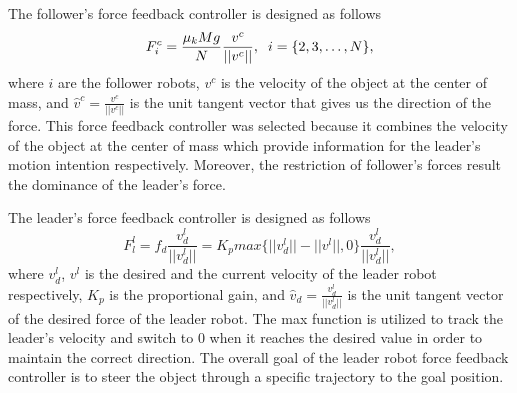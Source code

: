 \documentclass[letterpaper, 10 pt, conference]{ieeeconf}
\begin{document}
The follower's force feedback controller is designed as follows
\begin{equation}\label{cbfc}
F_i^c=\frac{\mu_k Mg}{N}\frac{v^c}{||v^c||}, \hspace{.2cm} i=\{ 2,3,\hdots , N\},
\end{equation}
where $i$ are the follower robots, $v^c$ is the velocity of the object at the center of mass, and $\hat{v}^c=\frac{v^c}{||v^c||}$ is the unit tangent vector that gives us the direction of the force. This force feedback controller was selected because it combines the velocity of the object at the center of mass which provide information for the leader's motion intention respectively. Moreover, the restriction of follower's forces result the dominance  of the leader's force.

The leader's force feedback controller is designed as follows
\begin{equation}\label{cblc}
F_l^l= f_d \frac{v_d^l}{||v_d^l||}= K_pmax\{ ||v_d^l||-||v^l||,0 \}\frac{v_d^l}{||v_d^l||},
\end{equation}
where $v_d^l$, $v^l$ is the desired and the current velocity of the leader robot respectively, $K_p$ is the proportional gain, and $\hat{v}_d=\frac{v_d^l}{||v_d^l||}$ is the unit tangent vector of the desired force of the leader robot. The max function is utilized to track the leader's velocity and switch to $0$ when it reaches the desired value in order to maintain the correct direction. The overall goal of the leader robot force feedback controller is to steer the object through a specific trajectory to the goal position.
\end{document}
